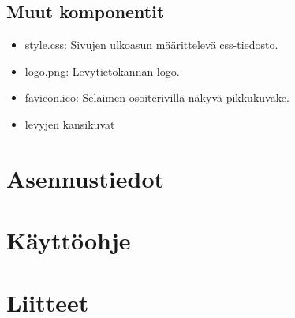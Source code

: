 \documentclass[a4paper,12pt]{report}
\begin{document}
\subsection{Muut komponentit}

\begin{itemize}
  \item style.css: Sivujen ulkoasun määrittelevä css-tiedosto.
  \item logo.png: Levytietokannan logo.
  \item favicon.ico: Selaimen osoiterivillä näkyvä pikkukuvake.
  \item levyjen kansikuvat
\end{itemize}

\section{Asennustiedot}

\section{Käyttöohje}

\section{Liitteet}
\end{document}
